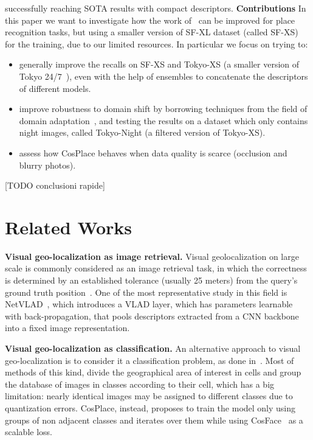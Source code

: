 \documentclass[10pt,twocolumn,letterpaper]{article}
\begin{document}
successfully reaching SOTA results with compact descriptors.
\newline
\textbf{Contributions}
In this paper we want to investigate how the work of~\cite{Berton_CVPR_2022_CosPlace} can be improved for place recognition tasks, but using a smaller version of SF-XL dataset (called SF-XS) for the training, due to our limited resources.
In particular we focus on trying to:
\begin{itemize}
    \item generally improve the recalls on SF-XS and Tokyo-XS (a smaller version of Tokyo 24/7~\cite{tokyo247}), even with the help of ensembles to concatenate the descriptors of different models.
    \item improve robustness to domain shift by borrowing techniques from the field of domain adaptation~\cite{adageo}, and testing the results on a dataset which only contains night images, called Tokyo-Night (a filtered version of Tokyo-XS).
    \item assess how CosPlace behaves when data quality is scarce (\eg occlusion and blurry photos). 
\end{itemize} 

[TODO conclusioni rapide]


\section{Related Works}\label{sec:relatedworks}
\textbf{Visual geo-localization as image retrieval.} Visual geolocalization on large scale is commonly considered as an image retrieval task, in which the correctness is determined by an established
tolerance (usually 25 meters) from the query's ground truth position~\cite{netvlad, adageo}.    
One of the most representative study in this field is NetVLAD~\cite{netvlad}, which introduces a VLAD layer, which has parameters learnable with back-propagation, that pools descriptors extracted from a CNN backbone into a fixed image representation.
\newline

\textbf{Visual geo-localization as classification.}
An alternative approach to visual geo-localization is to consider it a classification problem, as done in~\cite{Berton_CVPR_2022_CosPlace}. Most of methods of this kind, divide the geographical area of interest in cells and group the database of images in classes according to their cell, which has a big limitation: nearly identical images may be assigned to different classes due to quantization errors.
CosPlace, instead, proposes to train the model only using groups of non adjacent classes and iterates over them while using CosFace~\cite{cosface} as a scalable loss.
\newline
\end{document}
